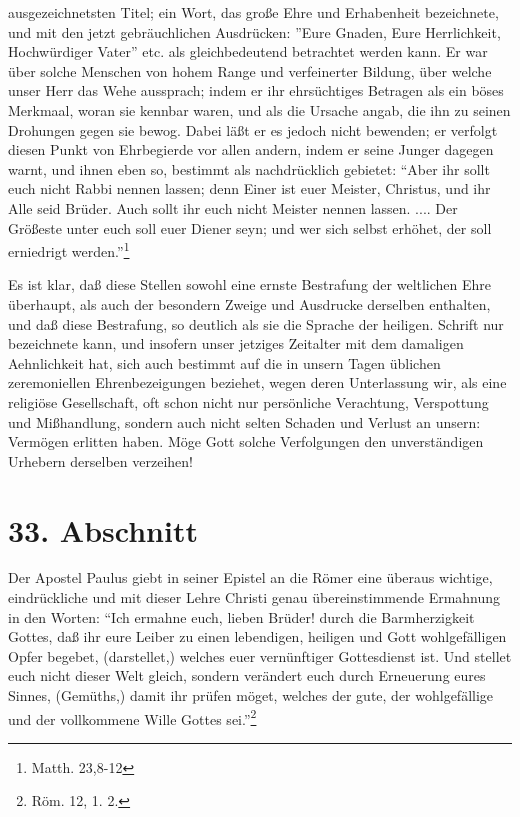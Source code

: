 ausgezeichnetsten Titel; ein Wort, das große Ehre und Erhabenheit bezeichnete,
und mit den jetzt gebräuchlichen Ausdrücken: ''Eure Gnaden, Eure Herrlichkeit,
Hochwürdiger Vater'' etc. als gleichbedeutend betrachtet werden kann. Er war
über solche Menschen von hohem Range und verfeinerter Bildung, über welche unser
Herr das Wehe aussprach; indem er ihr ehrsüchtiges Betragen als ein böses
Merkmaal, woran sie kennbar waren, und als die Ursache angab, die ihn zu seinen
Drohungen gegen sie bewog. Dabei läßt er es jedoch nicht bewenden; er verfolgt
diesen Punkt von Ehrbegierde vor allen andern, indem er seine Junger dagegen
warnt, und ihnen eben so, bestimmt als nachdrücklich gebietet: "`Aber ihr sollt
euch nicht Rabbi nennen lassen; denn Einer ist euer Meister, Christus, und ihr
Alle seid Brüder. Auch sollt ihr euch nicht Meister nennen lassen. .... Der
Größeste unter euch soll euer Diener seyn; und wer sich selbst erhöhet, der soll
erniedrigt werden."'\footnote{Matth. 23,8-12}

Es ist klar, daß diese Stellen sowohl eine ernste Bestrafung der weltlichen Ehre
überhaupt, als auch der besondern Zweige und Ausdrucke derselben enthalten, und
daß diese Bestrafung, so deutlich als sie die Sprache der heiligen. Schrift nur
bezeichnete kann, und insofern unser jetziges Zeitalter mit dem damaligen
Aehnlichkeit hat, sich auch bestimmt auf die in unsern Tagen üblichen
zeremoniellen Ehrenbezeigungen beziehet, wegen deren Unterlassung wir, als eine
religiöse Gesellschaft, oft schon nicht nur persönliche Verachtung, Verspottung
und Mißhandlung, sondern auch nicht selten Schaden und Verlust an unsern:
Vermögen erlitten haben. Möge Gott solche Verfolgungen den unverständigen
Urhebern derselben verzeihen!

\section{33. Abschnitt}

Der Apostel Paulus giebt in seiner Epistel an die Römer eine überaus wichtige,
eindrückliche und mit dieser Lehre Christi genau übereinstimmende Ermahnung in
den Worten: "`Ich ermahne euch, lieben Brüder! durch die Barmherzigkeit Gottes,
daß ihr eure Leiber zu einen lebendigen, heiligen und Gott wohlgefälligen Opfer
begebet, (darstellet,) welches euer vernünftiger Gottesdienst ist. Und stellet
euch nicht dieser Welt gleich, sondern verändert euch durch Erneuerung eures
Sinnes, (Gemüths,) damit ihr prüfen möget, welches der gute, der wohlgefällige
und der vollkommene Wille Gottes sei."'\footnote{Röm. 12, 1. 2.}

